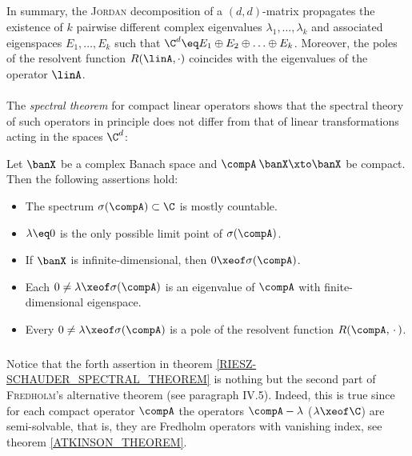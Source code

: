 \documentclass[11pt,twoside]{article}
\begin{document}
\subparagraph{}
In summary,
the \textsc{Jordan} decomposition of a $(d,d)$-matrix
propagates the existence of $k$ pairwise different complex eigenvalues
$\lambda_1,\ldots,\lambda_k$ and associated eigenspaces $E_1,\ldots,E_k$
such that
$\C^d \eq E_1 \oplus E_2 \oplus \ldots \oplus E_k$.
Moreover,
the poles of the resolvent function $R(\linA,\cdot)$ 
coincides with the eigenvalues of the operator $\linA$.

\paragraph{} %
The \textit{spectral theorem} for compact linear operators shows
that the spectral theory of such operators in principle does not differ
from that of linear transformations acting in the spaces $\C^d$: 

\begin{theorem1}\label{RIESZ-SCHAUDER_SPECTRAL_THEOREM}
Let $\banX$ be a complex Banach space and $\compA\:\banX \xto \banX$ be compact.
Then the following assertions hold:

\begin{itemize}[leftmargin=15pt]
\item[(a)]
The spectrum $\sigma(\compA) \subset \C$ is mostly countable.

\item[(b)]
$\lambda \eq 0$ is the only possible limit point of $\sigma(\compA)$.

\item[(c)]
If $\banX$ is infinite-dimensional, then $0 \xeof \sigma(\compA)$.

\item[(d)]
Each $0 \neq \lambda \xeof \sigma(\compA)$ is an eigenvalue of $\compA$
with finite-dimensional eigenspace.

\item[(e)]
Every $0 \neq \lambda \xeof \sigma(\compA)$
is a pole of the resolvent function $R(\compA,\, \cdot \,)$.
\end{itemize}
\end{theorem1}

\subparagraph{}
Notice
that the forth assertion in theorem \ref{RIESZ-SCHAUDER_SPECTRAL_THEOREM}
is nothing but the second part of \textsc{Fredholm}'s {alternative theorem}
(see paragraph IV.5).
Indeed,
this is true
since for each compact operator $\compA$
the operators $\compA - \lambda$ ($\lambda \xeof \C$) are semi-solvable,
that is,
they are Fredholm operators with vanishing index,
see theorem \ref{ATKINSON_THEOREM}.
\end{document}
